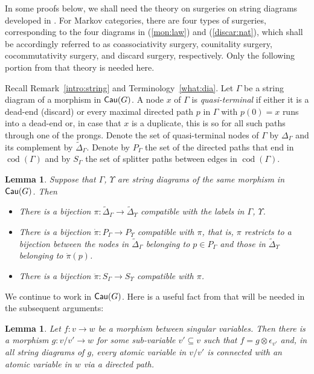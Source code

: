 \documentclass[12pt]{amsart}
\theoremstyle{plain}
\newtheorem{lem}[thm]{Lemma}
\theoremstyle{definition}
\theoremstyle{remark}
\numberwithin{equation}{section}
\theoremstyle{plain}
\DeclareMathOperator{\cod}{cod}
\newcommand{\0}{\emptyset}
\newcommand{\fun}{\longrightarrow}
\newcommand{\sub}{\subseteq}
\DeclareMathOperator{\cau}{\sf{Cau}}
\newcommand{\memph}[1]{{\color{magenta}\emph{#1}}}
\begin{document}
In some proofs below, we shall need the theory on surgeries on string diagrams developed in \cite{YinZhangModularity}. For Markov categories, there are four types of surgeries, corresponding to the four diagrams in (\ref{mon:law}) and (\ref{discar:nat}), which shall be accordingly referred to as coassociativity surgery,  counitality surgery,  cocommutativity surgery,  and  discard surgery,  respectively.   Only the following portion from that theory is needed here.

Recall Remark~\ref{intro:string} and Terminology~\ref{what:dia}.  Let $\Gamma$ be a string diagram of a morphism in $\cau(G)$.  A node $x$ of  $\Gamma$ is \memph{quasi-terminal} if either it is a dead-end (discard) or every maximal directed path $p$ in $\Gamma$ with $p(0) = x$  runs into a dead-end or, in case that $x$ is a duplicate, this is so for all such paths through one of the prongs.  Denote the set of quasi-terminal nodes of $\Gamma$ by $\Delta_\Gamma$ and its complement by  $\tilde \Delta_\Gamma$.  Denote by $P_\Gamma$ the set of the directed paths that end in  $\cod(\Gamma)$ and by $S_\Gamma$ the set of splitter paths between edges in $\cod(\Gamma)$.

\begin{lem}\label{decor:mat}
Suppose that  $\Gamma$, $\Upsilon$ are string diagrams of the same morphism in $\cau(G)$. Then
\begin{itemize}
  \item There is a bijection $\pi : \tilde \Delta_\Gamma \fun \tilde \Delta_{\Upsilon}$ compatible with the labels in $\Gamma$, $\Upsilon$.
  \item There is a bijection $\dot \pi :  P_\Gamma \fun P_{\Upsilon}$  compatible with $\pi$, that is, $\pi$ restricts to a bijection between the nodes in $\tilde \Delta_\Gamma$ belonging to $p \in P_\Gamma$ and those in $\tilde \Delta_\Upsilon$ belonging to $\dot \pi(p)$.
  \item There is a bijection $\ddot \pi : S_\Gamma \fun S_{\Upsilon}$ compatible with $\pi$.
\end{itemize}
\end{lem}

We continue to work in $\cau(G)$. Here is a useful fact from  \cite{YinZhangModularity} that will be  needed in the subsequent arguments:

\begin{lem}\label{infe:ances}
Let $f : v \fun w$ be a morphism between singular variables. Then there is a morphism $g : v / v' \fun w$ for some sub-variable $v' \sub v$ such that $f = g \otimes \epsilon_{v'}$ and, in all string diagrams of $g$, every atomic variable in $v / v'$ is connected with an atomic variable in $w$ via a directed path.
\end{lem}
\end{document}

